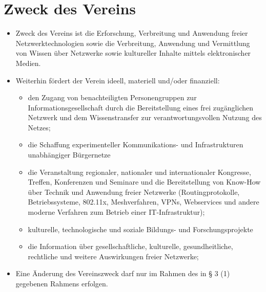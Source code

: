 \documentclass[a4paper,10pt]{article}
\begin{document}
\section{Zweck des Vereins}
  \begin{itemize}
    \item Zweck des Vereins ist die Erforschung, Verbreitung und Anwendung freier Netzwerktechnologien sowie die Verbreitung, Anwendung und Vermittlung von Wissen über Netzwerke sowie kultureller Inhalte mittels elektronischer Medien. 
    \item Weiterhin fördert der Verein ideell, materiell und/oder finanziell: 
    \begin{itemize}
      \item den Zugang von benachteiligten Personengruppen zur Informationsgesellschaft durch die Bereitstellung eines frei zugänglichen Netzwerk und dem Wissenstransfer zur verantwortungsvollen Nutzung des Netzes;
      \item die Schaffung experimenteller Kommunikations- und Infrastrukturen unabhängiger Bürgernetze 
      \item die Veranstaltung regionaler, nationaler und internationaler Kongresse, Treffen, Konferenzen und Seminare und die Bereitstellung von Know-How über Technik und Anwendung freier Netzwerke (Routingprotokolle, Betriebssysteme, 802.11x, Meshverfahren, VPNs, Webservices und andere moderne Verfahren zum Betrieb einer IT-Infrastruktur);
      \item kulturelle, technologische und soziale Bildungs- und Forschungsprojekte 
      \item die Information über gesellschaftliche, kulturelle, gesundheitliche, rechtliche und weitere Auswirkungen freier Netzwerke;
    \end{itemize}
    \item Eine Änderung des Vereinszweck darf nur im Rahmen des in § 3 (1) gegebenen Rahmens erfolgen. 
  \end{itemize}
  
\end{document}
